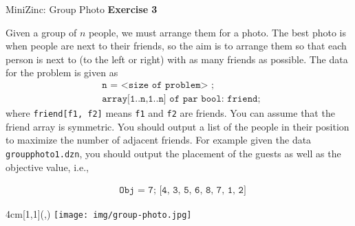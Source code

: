 \begin{frame}{MiniZinc: Group Photo}
\textbf{Exercise 3}

Given a group of $n$ people, we must arrange them for a photo. The best
photo is when people are next to their friends, so the aim is to arrange them so that each person
is next to (to the left or right) with as many friends as possible. The data for the
problem is given as
%
\begin{align*}
& \texttt{n = <size of problem> ;} \\
& \texttt{array[1..n,1..n] of par bool: friend; }
\end{align*} 
%
where \texttt{friend[f1, f2]} means \texttt{f1} and \texttt{f2} are friends. You can assume that the friend array is symmetric.
You should output a list of the people in their position to maximize the number of adjacent
friends. For example given the data \texttt{groupphoto1.dzn}, you should output the placement of the guests as well as the objective value, i.e.,

\begin{align*}
& \texttt{Obj = 7; [4, 3, 5, 6, 8, 7, 1, 2]}
\end{align*}


\begin{textblock*}{4cm}[1,1](\textwidth,\textheight-0.33cm)
\texttt{[image: img/group-photo.jpg]}
\end{textblock*}

\end{frame}
